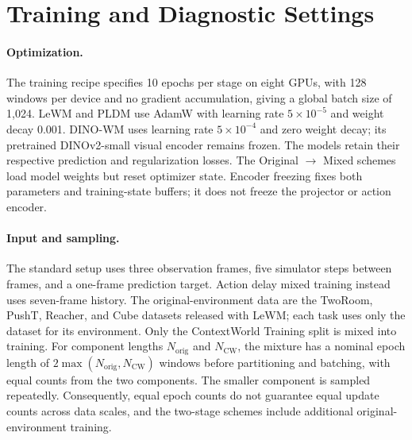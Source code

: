 \section{Training and Diagnostic Settings}
\label{app:training-settings}

\paragraph{Optimization.}
The training recipe specifies 10 epochs per stage on eight GPUs, with 128 windows per device and no gradient accumulation, giving a global batch size of 1,024.
LeWM and PLDM use AdamW with learning rate $5\times10^{-5}$ and weight decay 0.001.
DINO-WM uses learning rate $5\times10^{-4}$ and zero weight decay; its pretrained DINOv2-small visual encoder remains frozen.
The models retain their respective prediction and regularization losses.
The Original $\rightarrow$ Mixed schemes load model weights but reset optimizer state.
Encoder freezing fixes both parameters and training-state buffers; it does not freeze the projector or action encoder.

\paragraph{Input and sampling.}
The standard setup uses three observation frames, five simulator steps between frames, and a one-frame prediction target.
Action delay mixed training instead uses seven-frame history.
The original-environment data are the TwoRoom, PushT, Reacher, and Cube datasets released with LeWM; each task uses only the dataset for its environment.
Only the ContextWorld Training split is mixed into training.
For component lengths $N_{\mathrm{orig}}$ and $N_{\mathrm{CW}}$, the mixture has a nominal epoch length of $2\max(N_{\mathrm{orig}},N_{\mathrm{CW}})$ windows before partitioning and batching, with equal counts from the two components.
The smaller component is sampled repeatedly.
Consequently, equal epoch counts do not guarantee equal update counts across data scales, and the two-stage schemes include additional original-environment training.

